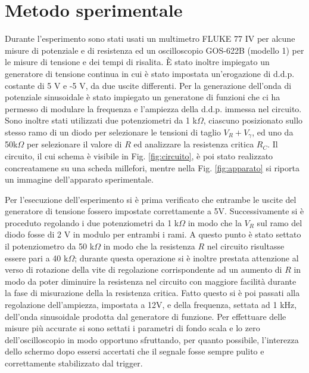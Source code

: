 \documentclass[a4paper,11pt]{article}
\begin{document}
	
	\section{Metodo sperimentale}
	
	Durante l'esperimento sono stati usati un multimetro FLUKE 77 IV per alcune misure di potenziale e di resistenza ed un oscilloscopio GOS-622B (modello 1) per le misure di tensione e dei tempi di risalita. È stato inoltre impiegato un generatore di tensione continua in cui è stato impostata un'erogazione di d.d.p. costante di 5 V e -5 V, da due uscite differenti. Per la generazione dell'onda di potenziale sinusoidale è stato impiegato un generatone di funzioni che ci ha permesso di modulare la frequenza e l'ampiezza della d.d.p. immessa nel circuito. Sono inoltre stati utilizzati due potenziometri da 1 k$\Omega$, ciascuno posizionato sullo stesso ramo di un diodo per selezionare le tensioni di taglio $V_R + V_\gamma$, ed uno da 50k$\Omega$ per selezionare il valore di $R$ ed analizzare la resistenza critica $R_C$. Il circuito, il cui schema è visibile in Fig. \ref{fig:circuito}, è poi stato realizzato concreatamene su una scheda millefori, mentre nella Fig. \ref{fig:apparato} si riporta un immagine dell'apparato sperimentale.
	
	Per l'esecuzione dell'esperimento si è prima verificato che entrambe le uscite del generatore di tensione fossero impostate correttamente a 5V. 
	Successivamente si è proceduto regolando i due potenziometri da 1 k$\Omega$ in modo che la $V_R$ sul ramo del diodo fosse di 2 V in modulo per entrambi i rami. A questo punto è stato settato il potenziometro da 50 k$\Omega$ in modo che la resistenza $R$ nel circuito risultasse essere pari a 40 k$\Omega$; durante questa operazione si è inoltre prestata attenzione al verso di rotazione della vite di regolazione corrispondente ad un aumento di $R$ in modo da poter diminuire la resistenza nel circuito con maggiore facilità durante la fase di misurazione della la resistenza critica. 
	Fatto questo si è poi passati alla regolazione dell'ampiezza, impostata a 12V, e della frequenza, settata ad 1 kHz, dell'onda sinusoidale prodotta dal generatore di funzione. Per effettuare delle misure più accurate si sono settati i parametri di fondo scala e lo zero dell'oscilloscopio in modo opportuno sfruttando, per quanto possibile, l'interezza dello schermo dopo essersi accertati che il segnale fosse sempre pulito e correttamente stabilizzato dal trigger.
	
\end{document}

